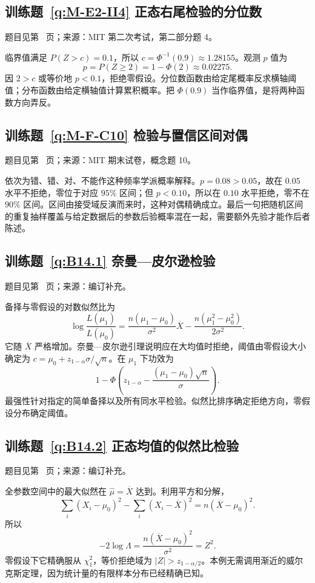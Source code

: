 \documentclass[UTF8,12pt,a4paper,fontset=fandol]{ctexbook}
\begin{document}
\subsection*{训练题~\ref{q:M-E2-II4} 正态右尾检验的分位数}\label{a:M-E2-II4}{\small 题目见第~\pageref{q:M-E2-II4} 页；来源：MIT 第二次考试，第二部分题 4。}
\begin{solve}临界值满足 $P(Z>c)=0.1$，所以 $c=\Phi^{-1}(0.9)\approx1.28155$。观测 $p$ 值为\[p=P(Z\ge2)=1-\Phi(2)\approx0.02275.\]因 $2>c$ 或等价地 $p<0.1$，拒绝零假设。分位数函数由给定尾概率反求横轴阈值；分布函数由给定横轴值计算累积概率。把 $\Phi(0.9)$ 当作临界值，是将两种函数方向弄反。\end{solve}

\subsection*{训练题~\ref{q:M-F-C10} 检验与置信区间对偶}\label{a:M-F-C10}{\small 题目见第~\pageref{q:M-F-C10} 页；来源：MIT 期末试卷，概念题 10。}
\begin{solve}依次为错、错、对、不能作这种频率学派概率解释。$p=0.08>0.05$，故在 $0.05$ 水平不拒绝，零位于对应 $95\%$ 区间；但 $p<0.10$，所以在 $0.10$ 水平拒绝，零不在 $90\%$ 区间。区间由接受域反演而来时，这种对偶精确成立。最后一句把随机区间的重复抽样覆盖与给定数据后的参数后验概率混在一起，需要额外先验才能作后者陈述。\end{solve}

\subsection*{训练题~\ref{q:B14.1} 奈曼—皮尔逊检验}\label{a:B14.1}{\small 题目见第~\pageref{q:B14.1} 页；来源：编订补充。}
\begin{solve}备择与零假设的对数似然比为\[\log\frac{L(\mu_1)}{L(\mu_0)}=\frac{n(\mu_1-\mu_0)}{\sigma^2}\overline X-\frac{n(\mu_1^2-\mu_0^2)}{2\sigma^2}.\]它随 $\overline X$ 严格增加。奈曼—皮尔逊引理说明应在大均值时拒绝，阈值由零假设大小确定为 $c=\mu_0+z_{1-\alpha}\sigma/\sqrt n$。在 $\mu_1$ 下功效为\[1-\Phi\left(z_{1-\alpha}-\frac{(\mu_1-\mu_0)\sqrt n}{\sigma}\right).\]最强性针对指定的简单备择以及所有同水平检验。似然比排序确定拒绝方向，零假设分布确定阈值。\end{solve}

\subsection*{训练题~\ref{q:B14.2} 正态均值的似然比检验}\label{a:B14.2}{\small 题目见第~\pageref{q:B14.2} 页；来源：编订补充。}
\begin{solve}全参数空间中的最大似然在 $\widehat\mu=\overline X$ 达到。利用平方和分解，\[\sum_i(X_i-\mu_0)^2-\sum_i(X_i-\overline X)^2=n(\overline X-\mu_0)^2.\]所以\[-2\log\Lambda=\frac{n(\overline X-\mu_0)^2}{\sigma^2}=Z^2.\]零假设下它精确服从 $\chi^2_1$，等价拒绝域为 $|Z|>z_{1-\alpha/2}$。本例无需调用渐近的威尔克斯定理，因为统计量的有限样本分布已经精确已知。\end{solve}
\end{document}
